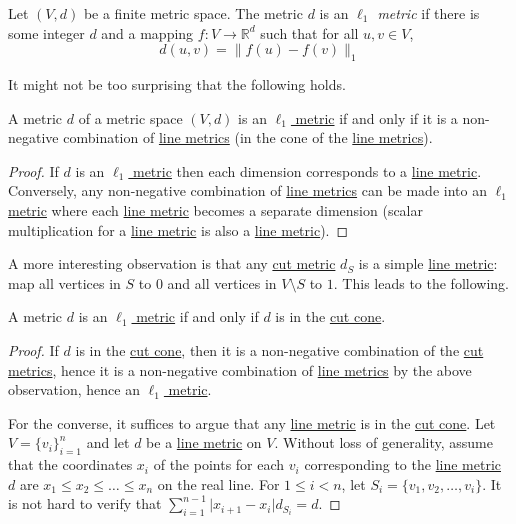 \begin{definition}\label{def:l1-metric}
	Let \((V, d)\) be a finite metric space. The metric \(d\) is an \emph{\(\ell _1\) metric} if there is some integer \(d\) and a mapping \(f \colon V \to \mathbb{R} ^d\) such that for all \(u, v \in V\),
	\[
		d(u, v)
		= \lVert f(u) - f(v) \rVert _1
	\]
\end{definition}

It might not be too surprising that the following holds.

\begin{lemma}\label{lma:l1-metric-iff-non-negative-combination-of-line-metric}
	A metric \(d\) of a metric space \((V, d)\) is an \hyperref[def:l1-metric]{\(\ell _1\) metric} if and only if it is a non-negative combination of \hyperref[def:line-metric]{line metrics} (in the cone of the \hyperref[def:line-metric]{line metrics}).
\end{lemma}
\begin{proof}
	If \(d\) is an \hyperref[def:l1-metric]{\(\ell _1\) metric} then each dimension corresponds to a \hyperref[def:line-metric]{line metric}. Conversely, any non-negative combination of \hyperref[def:line-metric]{line metrics} can be made into an \hyperref[def:l1-metric]{\(\ell _1\) metric} where each \hyperref[def:line-metric]{line metric} becomes a separate dimension (scalar multiplication for a \hyperref[def:line-metric]{line metric} is also a \hyperref[def:line-metric]{line metric}).
\end{proof}

A more interesting observation is that any \hyperref[def:cut-metric]{cut metric} \(d_S\) is a simple \hyperref[def:line-metric]{line metric}: map all vertices in \(S\) to \(0\) and all vertices in \(V \setminus S\) to \(1\). This leads to the following.

\begin{lemma}\label{lma:l1-metric-iff-cut-cone}
	A metric \(d\) is an \hyperref[def:l1-metric]{\(\ell _1\) metric} if and only if \(d\) is in the \hyperref[def:cut-cone]{cut cone}.
\end{lemma}
\begin{proof}
	If \(d\) is in the \hyperref[def:cut-cone]{cut cone}, then it is a non-negative combination of the \hyperref[def:cut-metric]{cut metrics}, hence it is a non-negative combination of \hyperref[def:line-metric]{line metrics} by the above observation, hence an \hyperref[def:l1-metric]{\(\ell _1\) metric}.

	For the converse, it suffices to argue that any \hyperref[def:line-metric]{line metric} is in the \hyperref[def:cut-cone]{cut cone}. Let \(V = \{ v_i \} _{i = 1}^{n}\) and let \(d\) be a \hyperref[def:line-metric]{line metric} on \(V\). Without loss of generality, assume that the coordinates \(x_i\) of the points for each \(v_i\) corresponding to the \hyperref[def:line-metric]{line metric} \(d\) are \(x_1 \leq x_2 \leq \dots \leq x_n\) on the real line. For \(1 \leq i < n\), let \(S_i = \{ v_1, v_2, \dots , v_i \} \). It is not hard to verify that \(\sum_{i=1}^{n-1} \lvert x_{i+1} - x_i \rvert d_{S_i} = d\).
\end{proof}

